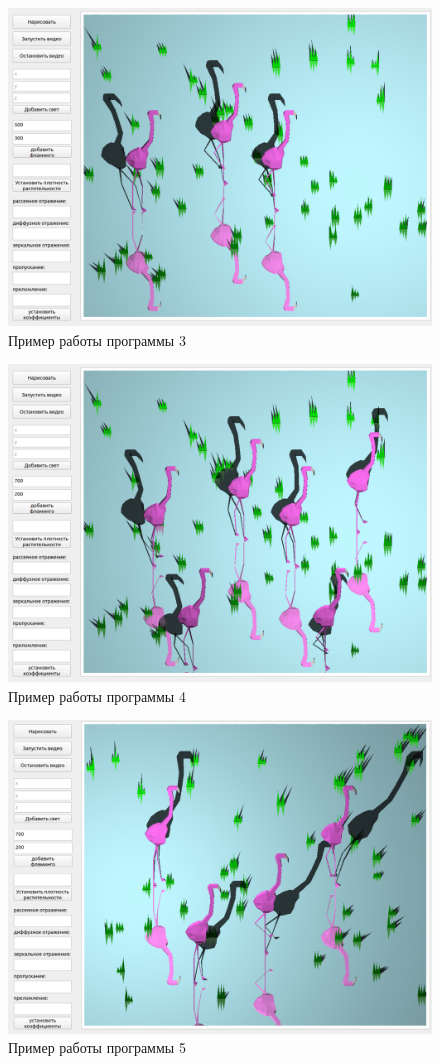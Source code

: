 \begin{figure}[h!]
	\centering
	\includegraphics[width=0.9\linewidth]{img/ex3}
	\caption{Пример работы программы 3}
	\label{fig:ex3}
\end{figure}

\begin{figure}[h!]
	\centering
	\includegraphics[width=0.9\linewidth]{img/ex4}
	\caption{Пример работы программы 4}
	\label{fig:ex4}
\end{figure}

\begin{figure}[h!]
	\centering
	\includegraphics[width=0.9\linewidth]{img/ex5}
	\caption{Пример работы программы 5}
	\label{fig:ex5}
\end{figure}

